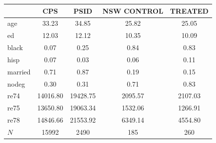 {
\def\sym#1{\ifmmode^{#1}\else\(^{#1}\)\fi}
\begin{tabular}{l*{4}{c}}
\hline\hline
            &\multicolumn{1}{c}{CPS}&\multicolumn{1}{c}{PSID}&\multicolumn{1}{c}{NSW CONTROL}&\multicolumn{1}{c}{TREATED}\\
\hline
age         &       33.23&       34.85&       25.82&       25.05\\
ed          &       12.03&       12.12&       10.35&       10.09\\
black       &        0.07&        0.25&        0.84&        0.83\\
hisp        &        0.07&        0.03&        0.06&        0.11\\
married     &        0.71&        0.87&        0.19&        0.15\\
nodeg       &        0.30&        0.31&        0.71&        0.83\\
re74        &    14016.80&    19428.75&     2095.57&     2107.03\\
re75        &    13650.80&    19063.34&     1532.06&     1266.91\\
re78        &    14846.66&    21553.92&     6349.14&     4554.80\\
\hline
\(N\)       &       15992&        2490&         185&         260\\
\hline\hline
\end{tabular}
}
